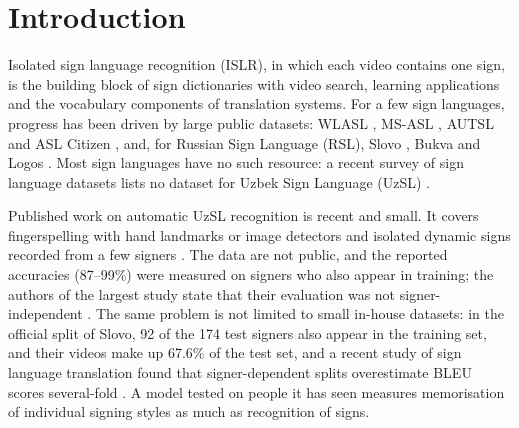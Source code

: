 \hypertarget{introduction}{%
\section{Introduction}\label{introduction}}

Isolated sign language recognition (ISLR), in which each video contains one sign, is the building block of sign dictionaries with video search, learning applications and the vocabulary components of translation systems. For a few sign languages, progress has been driven by large public datasets: WLASL \citep{2020_li_wlasl}, MS-ASL \citep{2019_joze_msasl}, AUTSL \citep{2020_sincan_autsl} and ASL Citizen \citep{2023_desai_asl_citizen}, and, for Russian Sign Language (RSL), Slovo \citep{2023_kapitanov_slovo}, Bukva \citep{2024_kvanchiani_bukva} and Logos \citep{2025_ovodov_logos}. Most sign languages have no such resource: a recent survey of sign language datasets lists no dataset for Uzbek Sign Language (UzSL) \citep{2026_ni_sign_language_datasets_survey}.

Published work on automatic UzSL recognition is recent and small. It covers fingerspelling with hand landmarks or image detectors \citep{2026_jovlieva_webcam_uzbek_fingerspelling, 2024_kayumov_uzsl_latin_angular_signs, 2024_akhmedov_uzsl_dactyl_yolo} and isolated dynamic signs recorded from a few signers \citep{2026_ergashev_cnnlstm_vs_squeezeformer_uzsl, 2025_akkomron_uzslr_isolated_dynamic}. The data are not public, and the reported accuracies (87--99\%) were measured on signers who also appear in training; the authors of the largest study state that their evaluation was not signer-independent \citep{2026_ergashev_cnnlstm_vs_squeezeformer_uzsl}. The same problem is not limited to small in-house datasets: in the official split of Slovo, 92 of the 174 test signers also appear in the training set, and their videos make up 67.6\% of the test set, and a recent study of sign language translation found that signer-dependent splits overestimate BLEU scores several-fold \citep{2026_artiaga_signer_dependence_slt}. A model tested on people it has seen measures memorisation of individual signing styles as much as recognition of signs.

